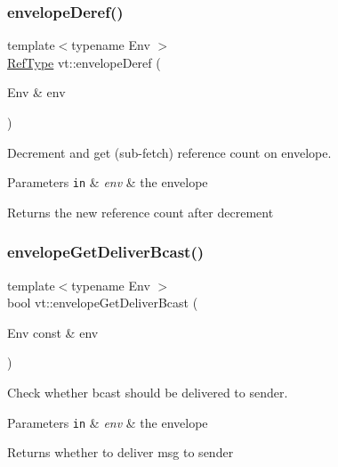 \subsubsection{\texorpdfstring{envelope\+Deref()}{envelopeDeref()}}
{\footnotesize\ttfamily template$<$typename Env $>$ \\
\hyperlink{namespacevt_a60fda95dc2316580f0ccf87d570f1d9e}{Ref\+Type} vt\+::envelope\+Deref (\begin{DoxyParamCaption}\item[{Env \&}]{env }\end{DoxyParamCaption})\hspace{0.3cm}{\ttfamily [inline]}}



Decrement and get (sub-\/fetch) reference count on envelope. 


\begin{DoxyParams}[1]{Parameters}
\mbox{\tt in}  & {\em env} & the envelope\\
\hline
\end{DoxyParams}
\begin{DoxyReturn}{Returns}
the new reference count after decrement 
\end{DoxyReturn}
\mbox{\label{namespacevt_a3f298caa64a97f60a0772b74cad8b620}} 
\subsubsection{\texorpdfstring{envelope\+Get\+Deliver\+Bcast()}{envelopeGetDeliverBcast()}}
{\footnotesize\ttfamily template$<$typename Env $>$ \\
bool vt\+::envelope\+Get\+Deliver\+Bcast (\begin{DoxyParamCaption}\item[{Env const \&}]{env }\end{DoxyParamCaption})\hspace{0.3cm}{\ttfamily [inline]}}



Check whether bcast should be delivered to sender. 


\begin{DoxyParams}[1]{Parameters}
\mbox{\tt in}  & {\em env} & the envelope\\
\hline
\end{DoxyParams}
\begin{DoxyReturn}{Returns}
whether to deliver msg to sender 
\end{DoxyReturn}
\mbox{\label{namespacevt_a99cdbbb47f13203e14b01fa43bca99e9}} 
